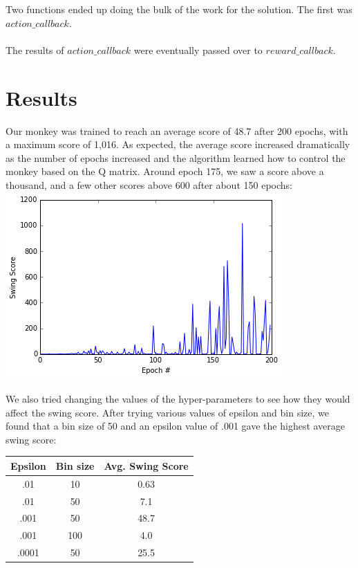 \documentclass{article}
\begin{document}
Two functions ended up doing the bulk of the work for the solution. The first was $action\_callback$.\\\\
The results of $action\_callback$ were eventually passed over to $reward\_callback$.
\section{Results}
Our monkey was trained to reach an average score of 48.7 after 200 epochs, with a maximum score of 1,016.  As expected, the average score increased dramatically as the number of epochs increased and the algorithm learned how to control the monkey based on the Q matrix. Around epoch 175, we saw a score above a thousand, and a few other scores above 600 after about 150 epochs:  \\

\includegraphics[scale=.7]{score_epoch.png}

We also tried changing the values of the  hyper-parameters to see how they would affect the swing score.  After trying various values of epsilon and bin size, we found that a bin size of 50 and an epsilon value of .001 gave the highest average swing score:  

\begin{center}
\begin{tabular}{ |c|c|c| } 
\hline
 {Epsilon} &  {Bin size}  &  {Avg. Swing Score} \\ 
 \hline
  .01 & 10 & 0.63 \\
  .01 & 50 & 7.1\\  
 .001 & 50 & 48.7 \\
 .001 & 100 & 4.0 \\
 .0001 & 50 & 25.5 \\  

\hline
\end{tabular}
\end{center}
\end{document}
